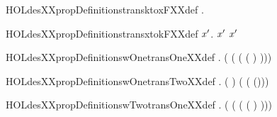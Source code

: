 \newcommand{\HOLdesXXpropDefinitionstransFTwoXXdef}{\UseVerbatim{HOLdesXXpropDefinitionstransFTwoXXdef}}
\begin{SaveVerbatim}{HOLdesXXpropDefinitionstransktoxFXXdef}
\HOLTokenTurnstile{} \HOLSymConst{\HOLTokenForall{}} .    \HOLSymConst{=}  \HOLSymConst{\HOLTokenEor{}} 
\end{SaveVerbatim}
\newcommand{\HOLdesXXpropDefinitionstransktoxFXXdef}{\UseVerbatim{HOLdesXXpropDefinitionstransktoxFXXdef}}
\begin{SaveVerbatim}{HOLdesXXpropDefinitionstransxtokFXXdef}
\HOLTokenTurnstile{} \HOLSymConst{\HOLTokenForall{}} \ensuremath{\HOLBoundVar{x}\sp{\prime{}}}.   \ensuremath{\HOLBoundVar{x}\sp{\prime{}}} \HOLSymConst{=}  \HOLSymConst{\HOLTokenEor{}} \ensuremath{\HOLBoundVar{x}\sp{\prime{}}}
\end{SaveVerbatim}
\newcommand{\HOLdesXXpropDefinitionstransxtokFXXdef}{\UseVerbatim{HOLdesXXpropDefinitionstransxtokFXXdef}}
\begin{SaveVerbatim}{HOLdesXXpropDefinitionswOnetransOneXXdef}
\HOLTokenTurnstile{} \HOLSymConst{\HOLTokenForall{}}.   \HOLSymConst{=}  ( ( (  (  ) )))
\end{SaveVerbatim}
\newcommand{\HOLdesXXpropDefinitionswOnetransOneXXdef}{\UseVerbatim{HOLdesXXpropDefinitionswOnetransOneXXdef}}
\begin{SaveVerbatim}{HOLdesXXpropDefinitionswOnetransTwoXXdef}
\HOLTokenTurnstile{} \HOLSymConst{\HOLTokenForall{}}.   \HOLSymConst{=}   (  ) ( ( (\HOLSymConst{,})))
\end{SaveVerbatim}
\newcommand{\HOLdesXXpropDefinitionswOnetransTwoXXdef}{\UseVerbatim{HOLdesXXpropDefinitionswOnetransTwoXXdef}}
\begin{SaveVerbatim}{HOLdesXXpropDefinitionswTwotransOneXXdef}
\HOLTokenTurnstile{} \HOLSymConst{\HOLTokenForall{}}.   \HOLSymConst{=}  ( ( (  (  ) )))
\end{SaveVerbatim}
